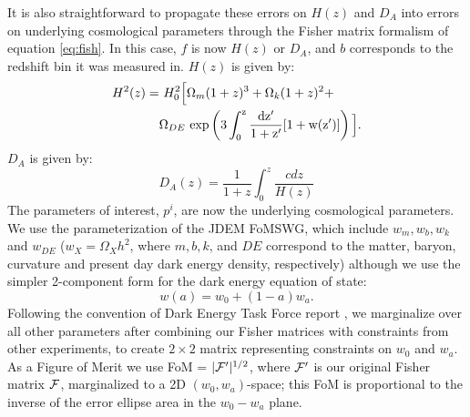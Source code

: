 \documentclass[10pt,iop]{emulateapj}
\begin{document}
It is also straightforward to propagate these errors on $H(z)$ and $D_A$ into errors on underlying
cosmological parameters through the Fisher matrix formalism of equation \ref{eq:fish}.
In this case, $f$ is now $H(z)$ or $D_A$, and $b$ corresponds to the redshift bin it was measured in.
$H(z)$ is given by:
\begin{align}
H^2(z) = &\ H_0^2\Big[ \Omega_m(1+z)^3 + \Omega_k(1+z)^2 + \nonumber \\
& \Omega_{DE}\ \rm{exp}\left(3\int_0^z\frac{dz'}{1+z'}[1+w(z')]\right)\Big].
\end{align}
$D_A$ is given by:
\begin{equation}
D_A(z) = \frac{1}{1+z}\int_0^z\frac{cdz}{H(z)}
\end{equation}
The parameters of interest, $p^i$, are now the underlying cosmological parameters.  We use
the parameterization of the JDEM FoMSWG, 
which include $w_m, w_b, w_k$ and $w_{DE}$ 
($w_X = \Omega_Xh^2$, where $m, b, k$, and $DE$ correspond to the matter, baryon, curvature and
present day dark energy density, respectively) although we use the simpler 2-component form
for the dark energy equation of state:
\begin{equation}
w(a) = w_0 + (1-a)w_a.
\end{equation}
Following the convention of Dark Energy Task Force report 
\citep{albrecht_et_al_2006}, we marginalize over all other parameters after combining 
our Fisher matrices with constraints from other experiments, to create $2\times2$ matrix representing
constraints on $w_0$ and $w_a$.  
As a Figure of Merit we use FoM = $|{\cal F'}|^{1/2}$, where $\cal F'$
is our original Fisher matrix $\cal F$, marginalized to a 2D $(w_0,w_a)$-space; this FoM
is proportional to the inverse of the error ellipse area in the $w_0-w_a$ plane.
\end{document}
